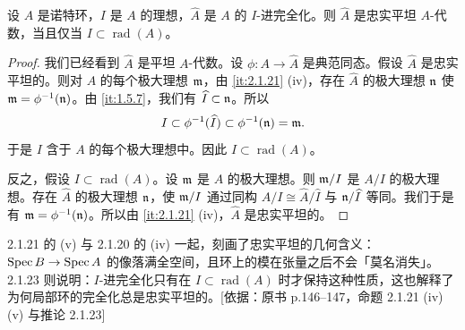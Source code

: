\begin{corollary}\label{it:2.1.23}
设 $A$ 是诺特环，$I$ 是 $A$ 的理想，$\widehat A$ 是 $A$ 的 $I$-进完全化。则 $\widehat A$ 是忠实平坦 $A$-代数，当且仅当 $I\subset\operatorname{rad}(A)$。
\end{corollary}
\begin{proof}
我们已经看到 $\widehat A$ 是平坦 $A$-代数。设 $\phi\colon A\to\widehat A$ 是典范同态。假设 $\widehat A$ 是忠实平坦的。则对 $A$ 的每个极大理想 $\mathfrak{m}$，由 \ref{it:2.1.21} (iv)，存在 $\widehat A$ 的极大理想 $\mathfrak{n}$ 使 $\mathfrak{m}=\phi^{-1}(\mathfrak{n})$。由 \ref{it:1.5.7}，我们有 $\widehat I\subset\mathfrak{n}$。所以
\[
I\subset\phi^{-1}(\widehat I)\subset\phi^{-1}(\mathfrak{n})=\mathfrak{m}.
\]
于是 $I$ 含于 $A$ 的每个极大理想中。因此 $I\subset\operatorname{rad}(A)$。

反之，假设 $I\subset\operatorname{rad}(A)$。设 $\mathfrak{m}$ 是 $A$ 的极大理想。则 $\mathfrak{m}/I$ 是 $A/I$ 的极大理想。存在 $\widehat A$ 的极大理想 $\mathfrak{n}$，使 $\mathfrak{m}/I$ 通过同构 $A/I\cong\widehat A/\widehat I$ 与 $\mathfrak{n}/\widehat I$ 等同。我们于是有 $\mathfrak{m}=\phi^{-1}(\mathfrak{n})$。所以由 \ref{it:2.1.21} (iv)，$\widehat A$ 是忠实平坦的。
\end{proof}
\begin{tnote}
2.1.21 的 (v) 与 2.1.20 的 (iv) 一起，刻画了忠实平坦的几何含义：$\operatorname{Spec} B\to\operatorname{Spec} A$ 的像落满全空间，且环上的模在张量之后不会「莫名消失」。2.1.23 则说明：$I$-进完全化只有在 $I\subset\operatorname{rad}(A)$ 时才保持这种性质，这也解释了为何局部环的完全化总是忠实平坦的。[依据：原书 p.146--147，命题 2.1.21 (iv)(v) 与推论 2.1.23]
\end{tnote}

